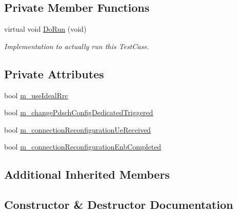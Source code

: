\subsection*{Private Member Functions}
\begin{DoxyCompactItemize}
\item 
virtual void \hyperlink{classLteDownlinkPowerControlRrcConnectionReconfigurationTestCase_a3f7be434747a85c448ade6fc4500d552}{Do\+Run} (void)
\begin{DoxyCompactList}\small\item\em Implementation to actually run this Test\+Case. \end{DoxyCompactList}\end{DoxyCompactItemize}
\subsection*{Private Attributes}
\begin{DoxyCompactItemize}
\item 
bool \hyperlink{classLteDownlinkPowerControlRrcConnectionReconfigurationTestCase_a9bd92ca03c62b95b5871c6ce5ad5beac}{m\+\_\+use\+Ideal\+Rrc}
\item 
bool \hyperlink{classLteDownlinkPowerControlRrcConnectionReconfigurationTestCase_a9db779c89ff70ec28f38d878cfcaff1a}{m\+\_\+change\+Pdsch\+Config\+Dedicated\+Triggered}
\item 
bool \hyperlink{classLteDownlinkPowerControlRrcConnectionReconfigurationTestCase_aa440780c8ea103c1e12b13b27fb0fef8}{m\+\_\+connection\+Reconfiguration\+Ue\+Received}
\item 
bool \hyperlink{classLteDownlinkPowerControlRrcConnectionReconfigurationTestCase_adeee87fb6c59598467eac1d09a75feaa}{m\+\_\+connection\+Reconfiguration\+Enb\+Completed}
\end{DoxyCompactItemize}
\subsection*{Additional Inherited Members}


\subsection{Constructor \& Destructor Documentation}
